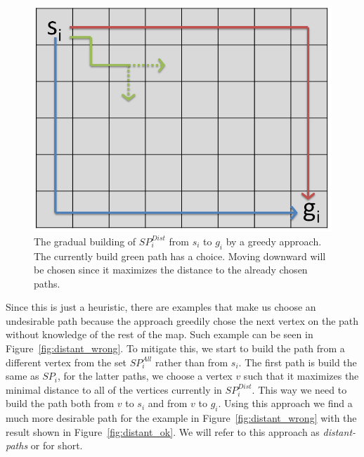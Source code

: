 \begin{figure}[ht]
\centering
\includegraphics[width=0.45\columnwidth]{img/distant_choose.PNG}
\caption{The gradual building of $SP_i^{Dist}$ from $s_i$ to $g_i$ by a greedy approach. The currently build green path has a choice. Moving downward will be chosen since it maximizes the distance to the already chosen paths.}
\label{fig:distant_choose}
\end{figure}

Since this is just a heuristic, there are examples that make us choose an undesirable path because the approach greedily chose the next vertex on the path without knowledge of the rest of the map. Such example can be seen in Figure~\ref{fig:distant_wrong}. To mitigate this, we start to build the path from a different vertex from the set $SP_i^{All}$ rather than from $s_i$. The first path is build the same as $SP_i$, for the latter paths, we choose a vertex $v$ such that it maximizes the minimal distance to all of the vertices currently in $SP_i^{Dist}$. This way we need to build the path both from $v$ to $s_i$ and from $v$ to $g_i$. Using this approach we find a much more desirable path for the example in Figure~\ref{fig:distant_wrong} with the result shown in Figure~\ref{fig:distant_ok}. We will refer to this approach as \emph{distant-paths} or \psd{} for short.


